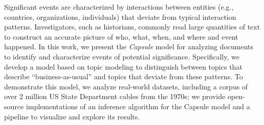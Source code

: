 
Significant events are characterized by interactions between entities (e.g., countries, organizations, individuals) that deviate from typical interaction patterns.  Investigators, such as historians, commonly read large quantities of text to construct an accurate picture of who, what, when, and where and event happened.  In this work, we present the \emph{Capsule} model for analyzing documents to identify and characterize events of potential significance.
Specifically, we develop a model based on topic modeling to distinguish between topics that describe ``business-as-usual'' and topics that deviate from these patterns.
To demonstrate this model, we analyze real-world datasets, including a corpus of over 2 million US State Department cables from the 1970s; we provide open-source implementations of an inference algorithm for the Capsule model and a pipeline to visualize and explore its results.